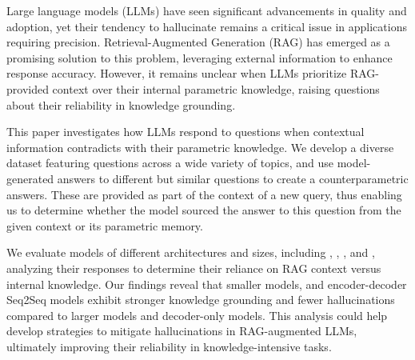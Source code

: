 Large language models (LLMs) have seen significant advancements in quality and adoption, yet their tendency to hallucinate remains a critical issue in applications requiring precision.
Retrieval-Augmented Generation (RAG) has emerged as a promising solution to this problem, leveraging external information to enhance response accuracy.
However, it remains unclear when LLMs prioritize RAG-provided context over their internal parametric knowledge, raising questions about their reliability in knowledge grounding.

This paper investigates how LLMs respond to questions when contextual information contradicts with their parametric knowledge.
We develop a diverse dataset featuring questions across a wide variety of topics, and use model-generated answers to different but similar questions to create a counterparametric answers.
These are provided as part of the context of a new query, thus enabling us to determine whether the model sourced the answer to this question from the given context or its parametric memory.

We evaluate models of different architectures and sizes, including \smallflan{}, \bigflan{}, \smallllama{}, and \bigllama{}, analyzing their responses to determine their reliance on RAG context versus internal knowledge.
Our findings reveal that smaller models, and encoder-decoder Seq2Seq models exhibit stronger knowledge grounding and fewer hallucinations compared to larger models and decoder-only models.
This analysis could help develop strategies to mitigate hallucinations in RAG-augmented LLMs, ultimately improving their reliability in knowledge-intensive tasks.
